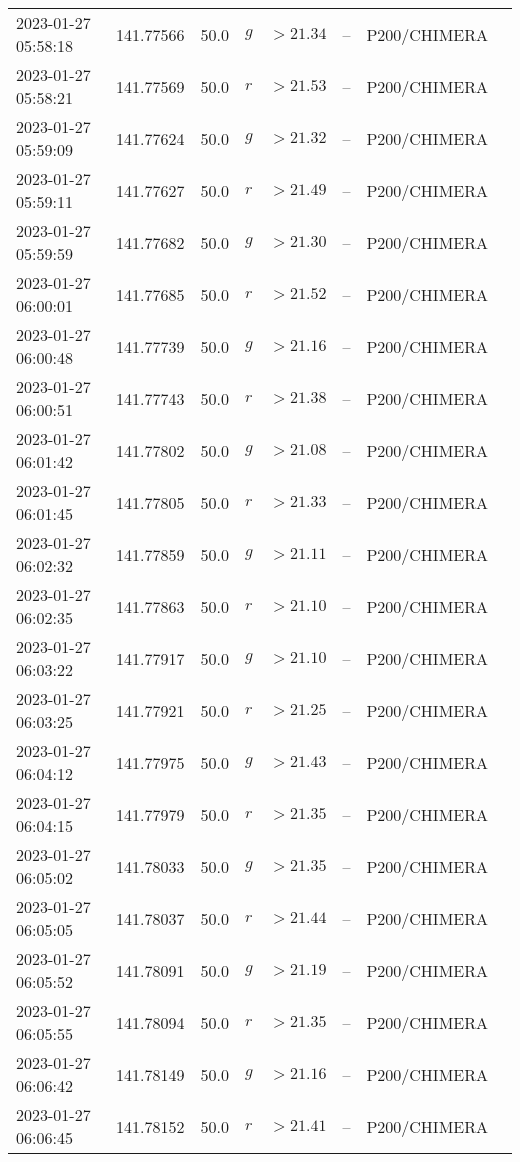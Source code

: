 \documentclass{nature_plusfigure}
\begin{document}
\begin{supplement}
\begin{center}
\begin{longtable}{llllllll}
2023-01-27 05:58:18 & 141.77566 & 50.0 & $g$ & $>21.34$ & -- & P200/CHIMERA &  \\ 
2023-01-27 05:58:21 & 141.77569 & 50.0 & $r$ & $>21.53$ & -- & P200/CHIMERA &  \\ 
2023-01-27 05:59:09 & 141.77624 & 50.0 & $g$ & $>21.32$ & -- & P200/CHIMERA &  \\ 
2023-01-27 05:59:11 & 141.77627 & 50.0 & $r$ & $>21.49$ & -- & P200/CHIMERA &  \\ 
2023-01-27 05:59:59 & 141.77682 & 50.0 & $g$ & $>21.30$ & -- & P200/CHIMERA &  \\ 
2023-01-27 06:00:01 & 141.77685 & 50.0 & $r$ & $>21.52$ & -- & P200/CHIMERA &  \\ 
2023-01-27 06:00:48 & 141.77739 & 50.0 & $g$ & $>21.16$ & -- & P200/CHIMERA &  \\ 
2023-01-27 06:00:51 & 141.77743 & 50.0 & $r$ & $>21.38$ & -- & P200/CHIMERA &  \\ 
2023-01-27 06:01:42 & 141.77802 & 50.0 & $g$ & $>21.08$ & -- & P200/CHIMERA &  \\ 
2023-01-27 06:01:45 & 141.77805 & 50.0 & $r$ & $>21.33$ & -- & P200/CHIMERA &  \\ 
2023-01-27 06:02:32 & 141.77859 & 50.0 & $g$ & $>21.11$ & -- & P200/CHIMERA &  \\ 
2023-01-27 06:02:35 & 141.77863 & 50.0 & $r$ & $>21.10$ & -- & P200/CHIMERA &  \\ 
2023-01-27 06:03:22 & 141.77917 & 50.0 & $g$ & $>21.10$ & -- & P200/CHIMERA &  \\ 
2023-01-27 06:03:25 & 141.77921 & 50.0 & $r$ & $>21.25$ & -- & P200/CHIMERA &  \\ 
2023-01-27 06:04:12 & 141.77975 & 50.0 & $g$ & $>21.43$ & -- & P200/CHIMERA &  \\ 
2023-01-27 06:04:15 & 141.77979 & 50.0 & $r$ & $>21.35$ & -- & P200/CHIMERA &  \\ 
2023-01-27 06:05:02 & 141.78033 & 50.0 & $g$ & $>21.35$ & -- & P200/CHIMERA &  \\ 
2023-01-27 06:05:05 & 141.78037 & 50.0 & $r$ & $>21.44$ & -- & P200/CHIMERA &  \\ 
2023-01-27 06:05:52 & 141.78091 & 50.0 & $g$ & $>21.19$ & -- & P200/CHIMERA &  \\ 
2023-01-27 06:05:55 & 141.78094 & 50.0 & $r$ & $>21.35$ & -- & P200/CHIMERA &  \\ 
2023-01-27 06:06:42 & 141.78149 & 50.0 & $g$ & $>21.16$ & -- & P200/CHIMERA &  \\ 
2023-01-27 06:06:45 & 141.78152 & 50.0 & $r$ & $>21.41$ & -- & P200/CHIMERA &  \\ 

\end{longtable}
\end{center}
\end{supplement}
\end{document}
